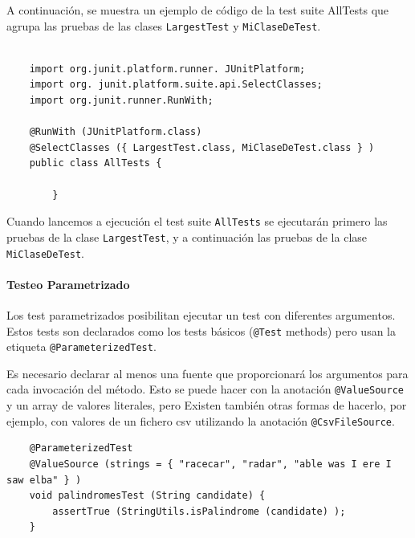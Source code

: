 A continuación, se muestra un ejemplo de código de la test suite AllTests que
agrupa las pruebas de las clases \lstinline|LargestTest| y \lstinline|MiClaseDeTest|.

\begin{lstlisting}
	
	import org.junit.platform.runner. JUnitPlatform;
	import org. junit.platform.suite.api.SelectClasses;
	import org.junit.runner.RunWith;
	
	@RunWith (JUnitPlatform.class)
	@SelectClasses ({ LargestTest.class, MiClaseDeTest.class } )
	public class AllTests {
		
		}
\end{lstlisting}

Cuando lancemos a ejecución el test suite \lstinline|AllTests| se ejecutarán primero las
pruebas de la clase \lstinline|LargestTest|, y a continuación las pruebas de la clase
\lstinline|MiClaseDeTest|.

\paragraph{Testeo Parametrizado}
Los test parametrizados posibilitan ejecutar un test con
diferentes argumentos.
Estos tests son declarados como los tests
básicos (\lstinline|@Test| methods) pero usan la etiqueta
\lstinline|@ParameterizedTest|.

Es necesario declarar al menos una fuente que proporcionará
los argumentos para cada invocación del método.
Esto se puede hacer con la anotación \lstinline|@ValueSource| y un
array de valores literales,
pero Existen también otras formas de hacerlo, por ejemplo, con
valores de un fichero csv utilizando la anotación
\lstinline|@CsvFileSource|.

\begin{lstlisting}
	@ParameterizedTest
	@ValueSource (strings = { "racecar", "radar", "able was I ere I saw elba" } )
	void palindromesTest (String candidate) {
		assertTrue (StringUtils.isPalindrome (candidate) );
	}
\end{lstlisting}

